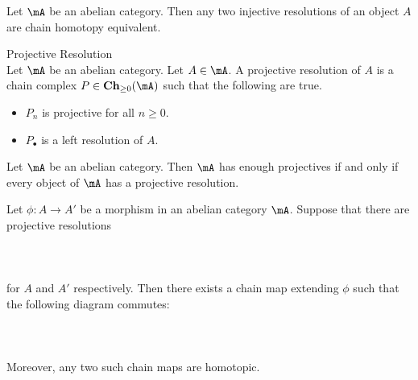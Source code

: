 \documentclass[a4paper]{article}
\begin{document}
\begin{lmm}{}{} Let $\mA$ be an abelian category. Then any two injective resolutions of an object $A$ are chain homotopy equivalent. 
\end{lmm}

\begin{defn}{Projective Resolution}{}\\
Let $\mA$ be an abelian category. Let $A\in\mA$. A projective resolution of $A$ is a chain complex $P\in\bold{Ch}_{\geq 0}(\mA)$ such that the following are true. 
\begin{itemize}
\item $P_n$ is projective for all $n\geq 0$. 
\item $P_\bullet$ is a left resolution of $A$. 
\end{itemize}
\end{defn}

\begin{prp}{}{} Let $\mA$ be an abelian category. Then $\mA$ has enough projectives if and only if every object of $\mA$ has a projective resolution. 
\end{prp}

\begin{prp}{}{} Let $\phi:A\to A'$ be a morphism in an abelian category $\mA$. Suppose that there are projective resolutions \\~\\
\\~\\
for $A$ and $A'$ respectively. Then there exists a chain map extending $\phi$ such that the following diagram commutes: \\~\\
\\~\\
Moreover, any two such chain maps are homotopic. 
\end{prp}
\end{document}
